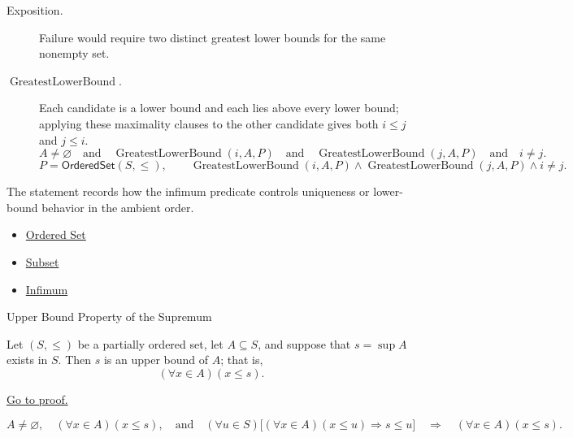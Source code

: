 \begin{remark*}
\begin{description}
  \item[Exposition.]
  Failure would require two distinct greatest lower bounds for the same
  nonempty set.

  \item[\(\operatorname{GreatestLowerBound}.\)]
  Each candidate is a lower bound and each lies above every lower bound;
  applying these maximality clauses to the other candidate gives both
  $i\leq j$ and $j\leq i$.
  \[
    A\neq\varnothing
    \quad\text{and}\quad
    \operatorname{GreatestLowerBound}(i,A,P)
    \quad\text{and}\quad
    \operatorname{GreatestLowerBound}(j,A,P)
    \quad\text{and}\quad
    i\neq j.
  \]
  \[
    P=\mathsf{OrderedSet}(S,\leq),\qquad
    \operatorname{GreatestLowerBound}(i,A,P)\land
    \operatorname{GreatestLowerBound}(j,A,P)\land i\neq j.
  \]
\end{description}
\end{remark*}

\begin{remark*}[Interpretation]
The statement records how the infimum predicate controls uniqueness or lower-bound behavior in the ambient order.
\end{remark*}

\begin{dependencies}
\begin{itemize}
  \item \hyperref[def:ordered-set]{Ordered Set}
  \item \hyperref[def:subset]{Subset}
  \item \hyperref[def:infimum]{Infimum}
\end{itemize}
\end{dependencies}

\begin{propositionbox}{Upper Bound Property of the Supremum}
\begin{proposition}
\label{prop:upper-bound-property-of-supremum}
Let $(S,\leq)$ be a partially ordered set, let $A\subseteq S$, and suppose
that $s=\sup A$ exists in $S$. Then $s$ is an upper bound of $A$; that is,
\[
  (\forall x\in A)(x\leq s).
\]

\hyperref[prf:upper-bound-property-of-supremum]{Go to proof.}
\end{proposition}
\end{propositionbox}

\begin{remark*}
\[
  A\neq\varnothing,
  \quad (\forall x\in A)(x\leq s),
  \quad\text{and}\quad
  (\forall u\in S)\bigl[(\forall x\in A)(x\leq u)\Rightarrow s\leq u\bigr]
  \quad\Longrightarrow\quad
  (\forall x\in A)(x\leq s).
\]
\end{remark*}

